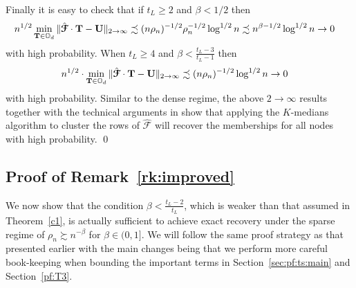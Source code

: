 \documentclass[10pt,journal,compsoc]{IEEEtran}
\newcommand{\ee}{\end{aligned} \end{equation}}
\newcommand{\bds}{\boldsymbol}
\newcommand{\twoinf}{2\rightarrow \infty}
\newcommand{\bee}{\begin{equation}\begin{aligned}}
\newcommand{\M}[1]{{{\mathbf{\MakeUppercase{#1}}}}}
\numberwithin{equation}{section}
\begin{document}
Finally it is easy to check that if $t_{L}\geq 2$ and $\beta < 1/2$ then
\bee\nonumber
n^{1/2} \min_{\M T \in \mathbb{O}_{d}} \|\hat{\bds{\mathcal{F}}} \cdot \mathbf{T} - \mathbf{U}\|_{\twoinf} &\precsim (n\rho_n)^{-1/2}\rho_n^{-1/2}\log^{1/2}{n}
\precsim n^{\beta - 1/2} \log^{1/2}{n}
\rightarrow 0
\ee
with high probability. When $t_L \geq 4$ and $\beta<\frac{t_L - 3}{t_L - 1}$ then
\bee\label{n12123}
n^{1/2}\cdot \min_{\M T \in \mathbb{O}_{d}} \|\hat{\bds{\mathcal{F}}} \cdot \mathbf{T} - \mathbf{U}\|_{\twoinf} &\precsim (n\rho_n)^{-1/2} \log^{1/2}{n}
\rightarrow 0
\ee
with high probability.
Similar to the dense regime, the above $2 \to \infty$ results together with the technical arguments in \cite{lei2019unified} show that applying the $K$-medians algorithm to cluster the rows of $\hat{\bds{\mathcal{F}}}$ will recover the memberships for all nodes with high probability. 
\qed

\subsection{Proof of Remark~\ref{rk:improved}}\label{sec:rk6:pf}
We now show that the condition $\beta < \frac{t_L - 2}{t_L}$, which is weaker than that assumed in Theorem~\ref{c1}, is actually sufficient to achieve exact recovery under the sparse regime of $\rho_n \succsim n^{-\beta}$ for $\beta \in (0,1]$. We will follow the same proof strategy as that presented earlier with the main changes being that we perform more careful book-keeping when bounding the important terms in Section~\ref{sec:pf:ts:main} and Section~\ref{pf:T3}.
\end{document}
